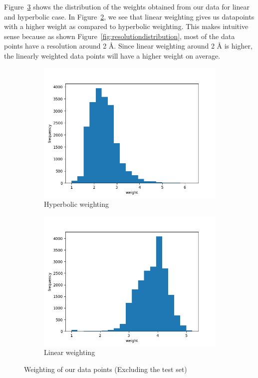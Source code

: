 \documentclass[11pt]{article}
\begin{document}
Figure~\ref{fig:WeightDistribution} shows the distribution of the weights obtained from our data for linear and hyperbolic case.
In Figure~\ref{fig:linearweightdistribution},  we see that linear weighting gives us datapoints with a higher weight as compared to hyperbolic weighting.
This makes intuitive sense because as shown Figure~\ref{fig:resolutiondistribution}, 
most of the data points have a resolution around 2 \si{\angstrom}.
Since linear weighting around 2 \si{\angstrom} is higher, the linearly weighted data points will have a higher weight on average.

\begin{figure}
     \centering
     \begin{subfigure}[b]{0.45\textwidth}
         \centering
    \includegraphics[scale=0.5]{images/hyperbolicweightdistribution}
    \caption{Hyperbolic weighting}
    \label{fig:hyperbolicweightdistribution}
     \end{subfigure}
     \hfill
     \begin{subfigure}[b]{0.45\textwidth}
         \centering
        \includegraphics[scale=0.5]{images/linearweightdistribution}
        \caption{Linear weighting}
        \label{fig:linearweightdistribution}
     \end{subfigure}
     \caption{Weighting of our data points (Excluding the test set)}
     \label{fig:WeightDistribution}
\end{figure}
\end{document}
